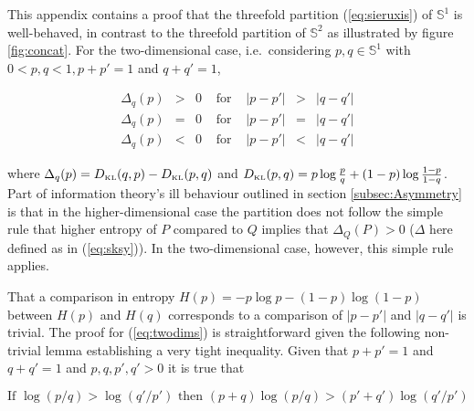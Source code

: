 \documentclass[11pt]{article}
\begin{document}

This appendix contains a proof that the threefold partition
(\ref{eq:sieruxis}) of $\mathbb{S}^{1}$ is well-behaved, in contrast
to the threefold partition of $\mathbb{S}^{2}$ as illustrated by
figure \ref{fig:concat}. For the two-dimensional case, i.e.\
considering $p,q\in\mathbb{S}^{1}$ with $0<p,q<1, p+p'=1$ and
$q+q'=1$,


\begin{equation}
  \label{eq:twodims}
  \begin{array}{rclcrcl}
  \Delta_{q}(p)&>&0&\mbox{ for }&|p-p'|&>&|q-q'|\\
  \Delta_{q}(p)&=&0&\mbox{ for }&|p-p'|&=&|q-q'|\\
  \Delta_{q}(p)&<&0&\mbox{ for }&|p-p'|&<&|q-q'|
  \end{array}
\end{equation}

where $\Delta_{q}(p)=D_{\mbox{\tiny KL}}(q,p)-D_{\mbox{\tiny
    KL}}(p,q)$ and $D_{\mbox{\tiny
    KL}}(p,q)=p\log\frac{p}{q}+(1-p)\log\frac{1-p}{1-q}$. Part of
information theory's ill behaviour outlined in section
\ref{subsec:Asymmetry} is that in the higher-dimensional case the
partition does not follow the simple rule that higher entropy of $P$
compared to $Q$ implies that $\Delta_{Q}(P)>0$ ($\Delta$ here defined
as in (\ref{eq:sksy})). In the two-dimensional case, however, this
simple rule applies. 

That a comparison in entropy $H(p)=-p\log{}p-(1-p)\log(1-p)$ between
$H(p)$ and $H(q)$ corresponds to a comparison of $|p-p'|$ and $|q-q'|$
is trivial. The proof for (\ref{eq:twodims}) is straightforward given
the following non-trivial lemma establishing a very tight inequality.
Given that $p+p'=1$ and $q+q'=1$ and $p,q,p',q'>0$ it is true
that

\begin{equation}
  \label{eq:lemma}
  \mbox{If }\log(p/q)>\log(q'/p')\mbox{ then }(p+q)\log(p/q)>(p'+q')\log(q'/p')
\end{equation}
\end{document}
